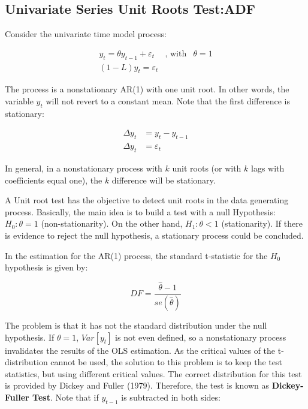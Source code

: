 \documentclass[]{article}
\begin{document}
\hypertarget{univariate-series-unit-roots-testadf}{%
\subsection{Univariate Series Unit Roots Test:ADF}\label{univariate-series-unit-roots-testadf}}

Consider the univariate time model process:

\begin{eqnarray*}
y_{t} =\theta y_{t-1} + \varepsilon_{t} & \textrm{, with} & \theta = 1 \\
(1-L)y_{t} = \varepsilon_{t}
\end{eqnarray*}

The process is a nonstationary AR(1) with one unit root. In other words, the variable \(y_{t}\) will not revert to a constant mean.
Note that the first difference is stationary:

\begin{align*}
\Delta y_{t} &= y_{t} - y_{t-1}\\
\Delta y_{t} &= \varepsilon_{t}
\end{align*}

In general, in a nonstationary process with \(k\) unit roots (or with \(k\) lags with coefficients equal one), the \(k\) difference will be stationary.

A Unit root test has the objective to detect unit roots in the data generating process. Basically, the main idea is to build a test with a null Hypothesis: \(H_{0} : \theta = 1\) (non-stationarity). On the other hand, \(H_{1}: \theta < 1\) (stationarity). If there is evidence to reject the null hypothesis, a stationary process could be concluded.

In the estimation for the AR(1) process, the standard t-statistic for the \(H_{0}\) hypothesis is given by:

\[DF = \dfrac{\hat{\theta} - 1}{se(\hat{\theta})}\]

The problem is that it has not the standard distribution under the null hypothesis. If \(\theta = 1\), \(Var[y_{t}]\) is not even defined, so a nonstationary process invalidates the results of the OLS estimation. As the critical values of the t-distribution cannot be used, the solution to this problem is to keep the test statistics, but using different critical values. The correct distribution for this test is provided by Dickey and Fuller (1979). Therefore, the test is known as \textbf{Dickey-Fuller Test}.
Note that if \(y_{t-1}\) is subtracted in both sides:
\end{document}
